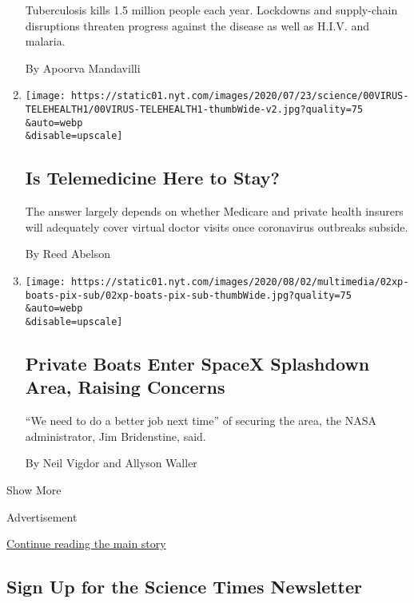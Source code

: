 \begin{enumerate}
  Tuberculosis kills 1.5 million people each year. Lockdowns and
  supply-chain disruptions threaten progress against the disease as well
  as H.I.V. and malaria.

  By Apoorva Mandavilli
\item
  \href{/2020/08/03/health/covid-telemedicine-congress.html}{}

  \texttt{[image: https://static01.nyt.com/images/2020/07/23/science/00VIRUS-TELEHEALTH1/00VIRUS-TELEHEALTH1-thumbWide-v2.jpg?quality=75\\\&auto=webp\\\&disable=upscale]}

  \hypertarget{is-telemedicine-here-to-stay}{%
  \subsection{Is Telemedicine Here to
  Stay?}\label{is-telemedicine-here-to-stay}}

  The answer largely depends on whether Medicare and private health
  insurers will adequately cover virtual doctor visits once coronavirus
  outbreaks subside.

  By Reed Abelson
\item
  \href{/2020/08/02/us/flag-boat-SpaceX.html}{}

  \texttt{[image: https://static01.nyt.com/images/2020/08/02/multimedia/02xp-boats-pix-sub/02xp-boats-pix-sub-thumbWide.jpg?quality=75\\\&auto=webp\\\&disable=upscale]}

  \hypertarget{private-boats-enter-spacex-splashdown-area-raising-concerns}{%
  \subsection{Private Boats Enter SpaceX Splashdown Area, Raising
  Concerns}\label{private-boats-enter-spacex-splashdown-area-raising-concerns}}

  ``We need to do a better job next time'' of securing the area, the
  NASA administrator, Jim Bridenstine, said.

  By Neil Vigdor and Allyson Waller
\end{enumerate}

Show More

Advertisement

\protect\hyperlink{after-mid2}{Continue reading the main story}

\hypertarget{sign-up-for-the-science-times-newsletter}{%
\subsection{Sign Up for the Science Times
Newsletter}\label{sign-up-for-the-science-times-newsletter}}

